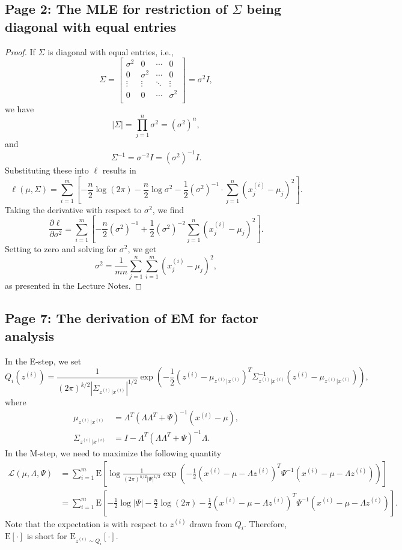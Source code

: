 \documentclass{article}
\begin{document}
\subsection{Page 2: The MLE for restriction of $\Sigma$ being diagonal with equal entries}
\begin{proof}
If $\Sigma$ is diagonal with equal entries, i.e.,
\[
\Sigma=
\begin{bmatrix}
\sigma^2 & 0 & \cdots & 0\\
0 & \sigma^2 & \cdots & 0 \\
\vdots & \vdots & \ddots & \vdots\\
0 & 0 & \cdots & \sigma^2 \\
\end{bmatrix}=\sigma^2 I,
\]
we have
\[
|\Sigma|=\prod_{j=1}^n \sigma^2=(\sigma^2)^n,
\]
and
\[
\Sigma^{-1}=\sigma^{-2}I=(\sigma^2)^{-1}I.
\]
Substituting these into $\ell$ results in
\[
\ell(\mu,\Sigma)=\sum_{i=1}^m\left[-\frac{n}{2}\log(2\pi)-\frac{n}{2} \log\sigma^2-\frac{1}{2}(\sigma^2)^{-1}\cdot\sum_{j=1}^n(x_j^{(i)}-\mu_j)^2\right].
\]
Taking the derivative with respect to $\sigma^2$, we find
\[
\frac{\partial \ell}{\partial \sigma^2}
=\sum_{i=1}^m\left[-\frac{n}{2}(\sigma^2)^{-1}+\frac{1}{2}(\sigma^2)^{-2}\sum_{j=1}^n(x_j^{(i)}-\mu_j)^2\right].
\]
Setting to zero and solving for $\sigma^2$, we get
\[
\sigma^2=\frac{1}{mn}\sum_{j=1}^n\sum_{i=1}^m (x_j^{(i)}-\mu_j)^2,
\]
as presented in the Lecture Notes.
\end{proof}

\subsection{Page 7: The derivation of EM for factor analysis}
In the E-step, we set
\[
Q_i(z^{(i)})=\frac{1}{(2\pi)^{k/2}|\Sigma_{z^{(i)}|x^{(i)}}|^{1/2}}
\exp\left(-\frac{1}{2}(z^{(i)}-\mu_{z^{(i)}|x^{(i)}})^T\Sigma_{z^{(i)}|x^{(i)}}^{-1}(z^{(i)}-\mu_{z^{(i)}|x^{(i)}})\right),
\]
where
\[
\begin{split}
\mu_{z^{(i)}|x^{(i)}}&=\Lambda^T(\Lambda\Lambda^T+\Psi)^{-1}(x^{(i)}-\mu),\\
\Sigma_{z^{(i)}|x^{(i)}}&=I-\Lambda^T(\Lambda\Lambda^T+\Psi)^{-1}\Lambda.
\end{split}
\]
In the M-step, we need to maximize the following quantity
\[
\begin{split}
\mathcal{L}(\mu,\Lambda,\Psi)
&=\sum_{i=1}^m \text{E}\left[\log\frac{1}{(2\pi)^{n/2}|\Psi|^{1/2}}
\exp\left(-\frac{1}{2}(x^{(i)}-\mu-\Lambda z^{(i)})^T\Psi^{-1}(x^{(i)}-\mu-\Lambda z^{(i)})\right)\right]\\
&=\sum_{i=1}^m \text{E}\left[-\frac{1}{2}\log|\Psi|-\frac{n}{2}\log(2\pi)
-\frac{1}{2}(x^{(i)}-\mu-\Lambda z^{(i)})^T\Psi^{-1}(x^{(i)}-\mu-\Lambda z^{(i)})\right].
\end{split}
\]
Note that the expectation is with respect to $z^{(i)}$ drawn from $Q_i$. Therefore, $\text{E}[\cdot]$ is short for $\text{E}_{z^{(i)}\sim Q_i}[\cdot]$.
\end{document}

